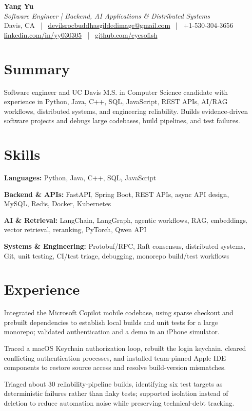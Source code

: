\documentclass[letterpaper,10pt]{article}
\begin{document}
\begin{center}
  \textbf{\Large Yang Yu} \\
  \textit{Software Engineer | Backend, AI Applications \& Distributed Systems} \\[1pt]
  \small Davis, CA ~|~ \href{mailto:devilsrocbuddhasgildedimage@gmail.com}{devilsrocbuddhasgildedimage@gmail.com} ~|~ +1-530-304-3656 \\
  \small \href{https://linkedin.com/in/yy030305}{linkedin.com/in/yy030305} ~|~ \href{https://github.com/eyesofish}{github.com/eyesofish}
\end{center}

\section{Summary}
Software engineer and UC Davis M.S. in Computer Science candidate with experience in Python, Java, C++, SQL, JavaScript, REST APIs, AI/RAG workflows, distributed systems, and engineering reliability. Builds evidence-driven software projects and debugs large codebases, build pipelines, and test failures.

\section{Skills}
\resumeItemListStart
  \item \textbf{Languages:} Python, Java, C++, SQL, JavaScript
  \item \textbf{Backend \& APIs:} FastAPI, Spring Boot, REST APIs, async API design, MySQL, Redis, Docker, Kubernetes
  \item \textbf{AI \& Retrieval:} LangChain, LangGraph, agentic workflows, RAG, embeddings, vector retrieval, reranking, PyTorch, Qwen API
  \item \textbf{Systems \& Engineering:} Protobuf/RPC, Raft consensus, distributed systems, Git, unit testing, CI/test triage, debugging, monorepo build/test workflows
\resumeItemListEnd

\section{Experience}
\resumeSubHeadingListStart
{}
\resumeItemListStart
  \item Integrated the Microsoft Copilot mobile codebase, using sparse checkout and prebuilt dependencies to establish local builds and unit tests for a large monorepo; validated authentication and a demo in an iPhone simulator.
  \item Traced a macOS Keychain authorization loop, rebuilt the login keychain, cleared conflicting authentication processes, and installed team-pinned Apple IDE components to restore source access and resolve build-version mismatches.
  \item Triaged about 30 reliability-pipeline builds, identifying six test targets as deterministic failures rather than flaky tests; supported isolation instead of deletion to reduce automation noise while preserving technical-debt tracking.
\resumeItemListEnd
\resumeSubHeadingListEnd
\end{document}
